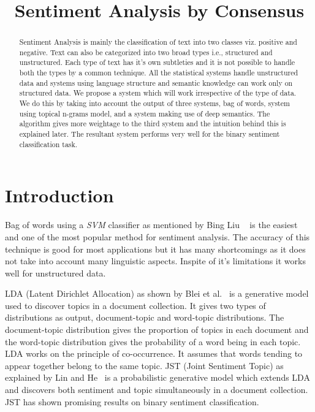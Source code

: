 \documentclass[11pt]{article}
\title{Sentiment Analysis by Consensus}
\date{}
\begin{document}
\maketitle
\begin{abstract}
Sentiment Analysis is mainly the classification of text into two classes viz. 
positive and negative. Text can also be categorized into two broad types i.e.,
structured and unstructured. Each type of text has it's own subtleties and 
it is not possible to handle both the types by a common technique. All the 
statistical systems handle unstructured data and systems using language structure
and semantic knowledge can work only on structured data. We propose a system 
which will work irrespective of the type of data. We do this by taking into 
account the output of three systems, bag of words, system using topical n-grams
model, and a system making use of deep semantics. The algorithm gives more 
weightage to the third system and the intuition behind this is explained later.
The resultant system performs very well for the binary sentiment classification
task.

\end{abstract}

\section{Introduction}

Bag of words using a \textit{SVM} classifier as mentioned by Bing Liu ~
is the easiest and one of the most popular method for sentiment analysis. The 
accuracy of this technique is good for most applications but it has many shortcomings
as it does not take into account many linguistic aspects. Inspite of it's 
limitations it works well for unstructured data.

\indent LDA (Latent Dirichlet Allocation) as shown by Blei et al.~
is a generative model used to discover topics in a document collection. It gives 
two types of distributions as output, document-topic and word-topic distributions. 
The document-topic distribution gives the proportion of topics in each document 
and the word-topic distribution gives the probability of a word being in each topic.
LDA works on the principle of co-occurrence. It assumes that words tending to appear
together belong to the same topic. JST (Joint Sentiment Topic) as explained by Lin 
and He~ is a probabilistic generative model which extends LDA
and discovers both sentiment and topic simultaneously in a document collection. JST 
has shown promising results on binary sentiment classification. 
\end{document}
